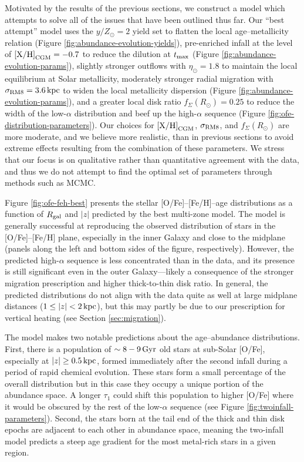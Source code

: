 \documentclass[twocolumn,twocolappendix,linenumbers]{aastex631}
\newcommand{\mathXH}{{\rm [X/H]}}
\newcommand{\yZ}[1]{$y/Z_\odot=#1$}
\newcommand{\kpc}{\,{\rm kpc}}
\newcommand{\Gyr}{\,{\rm Gyr}}
\begin{document}
Motivated by the results of the previous sections, we construct a model which attempts to solve all of the issues that have been outlined thus far. Our ``best attempt'' model uses the \yZ{2} yield set to flatten the local age--metallicity relation (Figure \ref{fig:abundance-evolution-yields}), pre-enriched infall at the level of $\mathXH_{\rm CGM}=-0.7$ to reduce the dilution at $t_{\rm max}$ (Figure \ref{fig:abundance-evolution-params}), slightly stronger outflows with $\eta_\odot=1.8$ to maintain the local equilibrium at Solar metallicity, moderately stronger radial migration with $\sigma_{\rm RM8}=3.6\kpc$ to widen the local metallicity dispersion (Figure \ref{fig:abundance-evolution-params}), and a greater local disk ratio $f_\Sigma(R_\odot)=0.25$ to reduce the width of the low-$\alpha$ distribution and beef up the high-$\alpha$ sequence (Figure \ref{fig:ofe-distribution-parameters}). Our choices for $\mathXH_{\rm CGM}$, $\sigma_{\rm RM8}$, and $f_\Sigma(R_\odot)$ are more moderate, and we believe more realistic, than in previous sections to avoid extreme effects resulting from the combination of these parameters. We stress that our focus is on qualitative rather than quantitative agreement with the data, and thus we do not attempt to find the optimal set of parameters through methods such as MCMC.

Figure \ref{fig:ofe-feh-best} presents the stellar [O/Fe]--[Fe/H]--age distributions as a function of $R_{\rm gal}$ and $|z|$ predicted by the best multi-zone model. The model is generally successful at reproducing the observed distribution of stars in the [O/Fe]--[Fe/H] plane, especially in the inner Galaxy and close to the midplane (panels along the left and bottom sides of the figure, respectively). However, the predicted high-$\alpha$ sequence is less concentrated than in the data, and its presence is still significant even in the outer Galaxy---likely a consequence of the stronger migration prescription and higher thick-to-thin disk ratio. In general, the predicted distributions do not align with the data quite as well at large midplane distances ($1\leq|z|<2\kpc$), but this may partly be due to our prescription for vertical heating (see Section \ref{sec:migration}).

The model makes two notable predictions about the age--abundance distributions. First, there is a population of $\sim8-9\Gyr$ old stars at sub-Solar [O/Fe], especially at $|z|\ge0.5\kpc$, formed immediately after the second infall during a period of rapid chemical evolution. These stars form a small percentage of the overall distribution \citep[see also Figure 11 from][]{spitoni_remind_2024} but in this case they occupy a unique portion of the abundance space. A longer $\tau_1$ could shift this population to higher [O/Fe] where it would be obscured by the rest of the low-$\alpha$ sequence (see Figure \ref{fig:twoinfall-parameters}). Second, the stars born at the tail end of the thick and thin disk epochs are adjacent to each other in abundance space, meaning the two-infall model predicts a steep age gradient for the most metal-rich stars in a given region.
\end{document}
